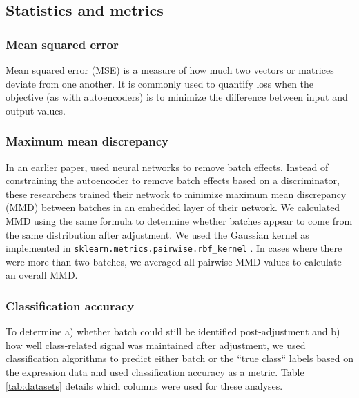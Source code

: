 \subsection{Statistics and metrics}

\subsubsection{Mean squared error}

Mean squared error (MSE) is a measure of how much two vectors or matrices deviate from one another.
It is commonly used to quantify loss when the objective (as with autoencoders) is to minimize the difference between input and output values.

\subsubsection{Maximum mean discrepancy} \label{section:mmd}

In an earlier paper, \citet{shaham_removal_2017} used neural networks to remove batch effects.
Instead of constraining the autoencoder to remove batch effects based on a discriminator, these researchers trained their network to minimize maximum mean discrepancy (MMD) between batches in an embedded layer of their network.
We calculated MMD using the same formula to determine whether batches appear to come from the same distribution after adjustment.
We used the Gaussian kernel as implemented in \texttt{sklearn.metrics.pairwise.rbf\_kernel} \cite{pedregosa_scikit-learn_2011}.
In cases where there were more than two batches, we averaged all pairwise MMD values to calculate an overall MMD.

\subsubsection{Classification accuracy}

To determine
a) whether batch could still be identified post-adjustment and
b) how well class-related signal was maintained after adjustment,
we used classification algorithms to predict either batch or the ``true class`` labels based on the expression data and used classification accuracy as a metric.
Table \ref{tab:datasets} details which columns were used for these analyses.

